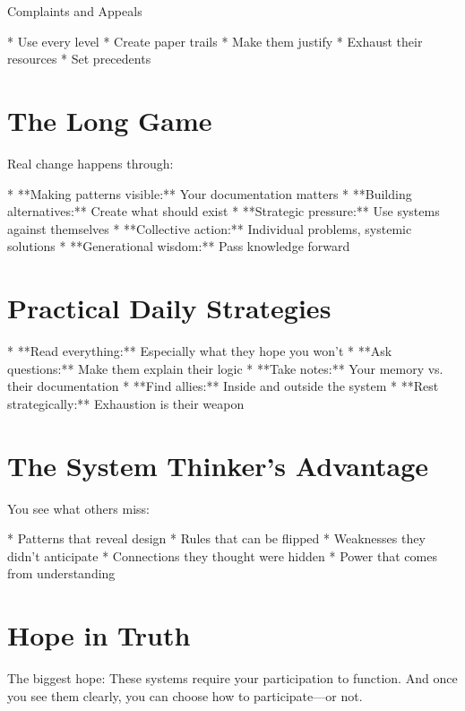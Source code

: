 \documentclass[12pt,oneside]{book}
\begin{document}
                Complaints and Appeals

                    * Use every level
                    * Create paper trails
                    * Make them justify
                    * Exhaust their resources
                    * Set precedents

\section{The Long Game}

Real change happens through:

                    * **Making patterns visible:** Your documentation matters
                    * **Building alternatives:** Create what should exist
                    * **Strategic pressure:** Use systems against themselves
                    * **Collective action:** Individual problems, systemic solutions
                    * **Generational wisdom:** Pass knowledge forward

\section{Practical Daily Strategies}

                    * **Read everything:** Especially what they hope you won't
                    * **Ask questions:** Make them explain their logic
                    * **Take notes:** Your memory vs. their documentation
                    * **Find allies:** Inside and outside the system
                    * **Rest strategically:** Exhaustion is their weapon

\section{The System Thinker's Advantage}

You see what others miss:

                    * Patterns that reveal design
                    * Rules that can be flipped
                    * Weaknesses they didn't anticipate
                    * Connections they thought were hidden
                    * Power that comes from understanding

\section{Hope in Truth}

The biggest hope: These systems require your participation to function. And once you see them clearly, you can choose how to participate---or not.
\end{document}
